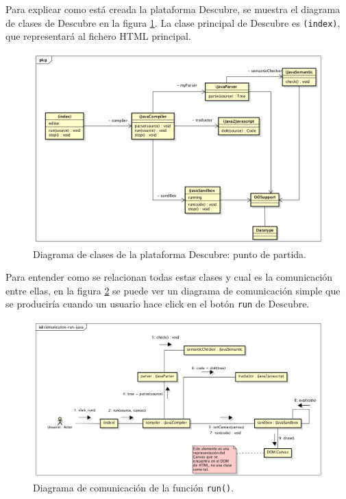 Para explicar como está creada la plataforma Descubre, se muestra el diagrama de clases de Descubre en la figura \ref{fig:diagram-ijava}. La clase principal de Descubre es \texttt{(index)}, que representará al fichero HTML principal.

\begin{figure}[!ht]
	\begin{centering}
		\includegraphics[width=1\textwidth]{images/diagram-ijava.png}
			\caption{Diagrama de clases de la plataforma Descubre: punto de partida.}
				\label{fig:diagram-ijava}
	\end{centering}
\end{figure}

Para entender como se relacionan todas estas clases y cual es la comunicación entre ellas, en la figura \ref{fig:comunication-ijava} se puede ver un diagrama de comunicación simple que se produciría cuando un usuario hace click en el botón \texttt{run} de Descubre.

\begin{figure}[!ht]
	\begin{centering}
		\includegraphics[width=1\textwidth]{images/comunication-run-ijava.png}
			\caption{Diagrama de comunicación de la función \texttt{run()}.}
				\label{fig:comunication-ijava}
	\end{centering}
\end{figure}

